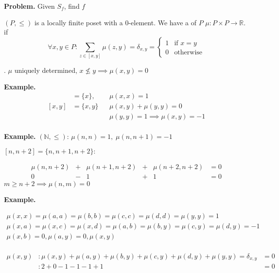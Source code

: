 \textbf{Problem.}
Given $S_f$, find $f$

\begin{definition}
$(P, \leq)$ is a locally finite poset with a 0-element.
We have a  of $P$ $\mu: P\times P \rightarrow \mathbb{R}$.
if
\[
  \forall x,y \in P: \sum_{z\in [x, y]} \mu(z,y) = \delta_{x,y} =
    \begin{cases}
      1 & \text{if } x = y \\
      0 & \text{otherwise}
    \end{cases}
\]
\end{definition}

\Remark.
$\mu$ uniquely determined, $x \not\leq y \implies \mu(x,y) = 0$

\textbf{Example.}
\begin{align*}
  [x,x] & = \{x\}, && \mu(x,x) = 1 \\
  [x,y] &= \{x,y\} && \mu(x,y) + \mu(y,y) = 0 \\
        &          && \mu(y,y) = 1 \implies \mu(x,y) = -1 \\
\end{align*}

\textbf{Example.}
$(\mathbb{N}, \leq)$: $\mu(n,n) = 1,\; \mu(n,n+1) = -1$

$[n,n+2] = \{n,n+1, n+2\}:$

\[
\begin{matrix}
  \mu(n,n+2) & + & \mu(n+1,n+2) & + & \mu(n+2, n+2) & = 0 \\
  0 & -&1 &+&1 & = 0
\end{matrix}
\]
$ m \geq n+2 \implies \mu(n,m) = 0$

\textbf{Example.}

\begin{gather*}
    \mu(x,x) = \mu(a,a) = \mu(b,b) = \mu(c,c) = \mu(d,d) = \mu(y,y) = 1\\
    \mu(x,a) = \mu(x,c) = \mu(x,d) = \mu(a,b) = \mu(b,y) = \mu(c,y) = \mu(d,y) = -1\\
    \mu(x,b) = 0, \mu(a,y) = 0, \mu(x,y) \\
\end{gather*}

\begin{align*}
    \mu(x,y)&: \mu(x,y) + \mu(a,y) + \mu(b,y) + \mu(c,y) + \mu(d,y) + \mu(y,y) = \delta_{x,y} &= 0 \\
        &: 2 +0 -1 -1 -1 +1 &= 0
\end{align*}


